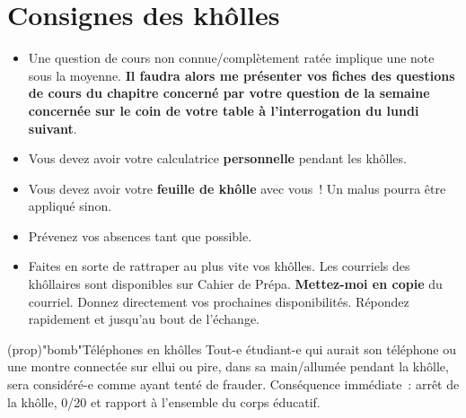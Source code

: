 \documentclass[a4paper, 12pt, final, garamond]{book}
\begin{document}
\setcounter{chapter}{0}

\chapter*{Consignes des khôlles}

\Large
\begin{itemize}
	\item Une question de cours non connue/complètement ratée implique une note
	      sous la moyenne. \textbf{Il faudra alors me présenter vos fiches des
		      questions de cours du chapitre concerné par votre question de la semaine
		      concernée sur le coin de votre table à l'interrogation du lundi suivant}.
	\item Vous devez avoir votre calculatrice \textbf{personnelle} pendant les
	      khôlles.
	\item Vous devez avoir votre \textbf{feuille de khôlle} avec vous~! Un malus
	      pourra être appliqué sinon.
	\item Prévenez vos absences tant que possible.
	\item Faites en sorte de rattraper au plus vite vos khôlles. Les courriels des
	      khôllaires sont disponibles sur Cahier de Prépa. \textbf{Mettez-moi en
		      copie} du courriel. Donnez directement vos prochaines disponibilités.
	      Répondez rapidement et jusqu'au bout de l'échange.
\end{itemize}

\begin{tcn}(prop)"bomb"{Téléphones en khôlles}
	Tout-e étudiant-e qui aurait son téléphone ou une montre connectée sur ellui
	ou pire, dans sa main/allumée pendant la khôlle, sera considéré-e comme ayant
	tenté de frauder.
	\bigbreak
	Conséquence immédiate~: arrêt de la khôlle, 0/20 et rapport à l'ensemble du
	corps éducatif.
\end{tcn}
\end{document}

